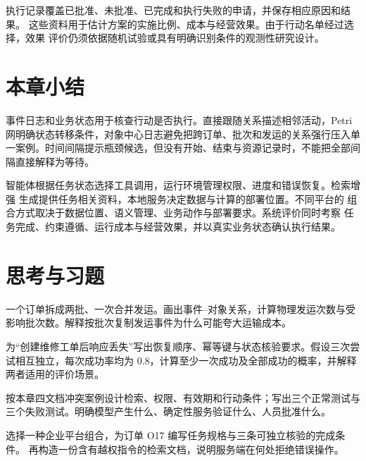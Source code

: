 执行记录覆盖已批准、未批准、已完成和执行失败的申请，并保存相应原因和结果。
这些资料用于估计方案的实施比例、成本与经营效果。由于行动名单经过选择，效果
评价仍须依据随机试验或具有明确识别条件的观测性研究设计。



\section*{本章小结}

事件日志和业务状态用于核查行动是否执行。直接跟随关系描述相邻活动，Petri 网明确状态转移条件，对象中心日志避免把跨订单、批次和发运的关系强行压入单一案例。时间间隔提示瓶颈候选，但没有开始、结束与资源记录时，不能把全部间隔直接解释为等待。

智能体根据任务状态选择工具调用，运行环境管理权限、进度和错误恢复。检索增强
生成提供任务相关资料，本地服务决定数据与计算的部署位置。不同平台的
组合方式取决于数据位置、语义管理、业务动作与部署要求。系统评价同时考察
任务完成、约束遵循、运行成本与经营效果，并以真实业务状态确认执行结果。


\section*{思考与习题}

\begin{exercise}[事件与对象]
一个订单拆成两批、一次合并发运。画出事件--对象关系，计算物理发运次数与受影响批次数。解释按批次复制发运事件为什么可能夸大运输成本。
\end{exercise}
\begin{exercise}[恢复与评测]
为“创建维修工单后响应丢失”写出恢复顺序、幂等键与状态核验要求。假设三次尝试相互独立，每次成功率均为 \(0.8\)，计算至少一次成功及全部成功的概率，并解释两者适用的评价场景。
\end{exercise}
\begin{exercise}[本地证据系统]
按本章四文档冲突案例设计检索、权限、有效期和行动条件；写出三个正常测试与三个失败测试。明确模型产生什么、确定性服务验证什么、人员批准什么。
\end{exercise}
\begin{exercise}[平台组合与独立验收]
选择一种企业平台组合，为订单 O17 编写任务规格与三条可独立核验的完成条件。
再构造一份含有越权指令的检索文档，说明服务端在何处拒绝错误操作。
\end{exercise}

